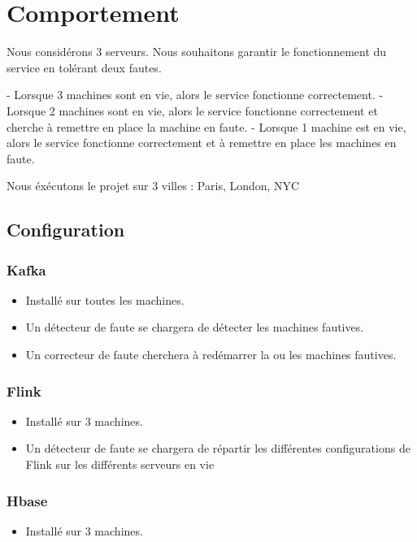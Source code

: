 \documentclass[a4paper,oneside,11pt]{article}
\begin{document}
\section{Comportement}

Nous considérons 3 serveurs. Nous souhaitons garantir le fonctionnement du service en tolérant deux fautes. 

- Lorsque 3 machines sont en vie, alors le service fonctionne correctement.
- Lorsque 2 machines sont en vie, alors le service fonctionne correctement et cherche à remettre en place la machine en faute.
- Lorsque 1 machine est en vie, alors le service fonctionne correctement et à remettre en place les machines en faute. 

Nous éxécutons le projet sur 3 villes : Paris, London, NYC

\subsection{Configuration}

\subsubsection{Kafka}

\begin{itemize}
\item Installé sur toutes les machines. 
\item Un détecteur de faute se chargera de détecter les machines fautives.
\item Un correcteur de faute cherchera à redémarrer la ou les machines fautives.
\end{itemize}

\subsubsection{Flink}

\begin{itemize}
\item Installé sur 3 machines. 
\item Un détecteur de faute se chargera de répartir les différentes configurations de Flink sur les différents serveurs en vie
\end{itemize}

\subsubsection{Hbase}

\begin{itemize}
\item Installé sur 3 machines. 
\end{itemize}	
\end{document}
